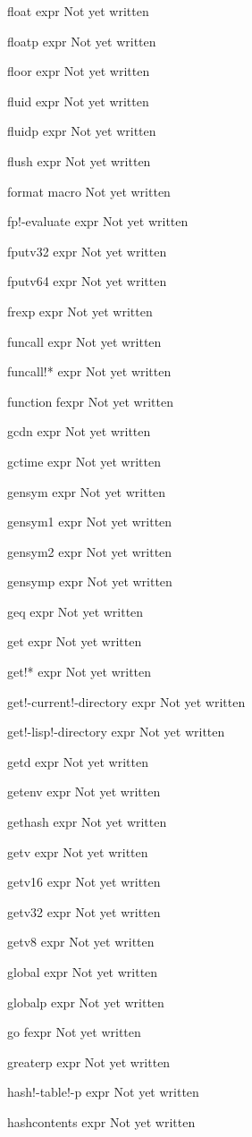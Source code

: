 \documentclass[a4paper,11pt]{article}
\begin{document}
\begin{description}
float expr
Not yet written

floatp expr
Not yet written

floor expr
Not yet written

fluid expr
Not yet written

fluidp expr
Not yet written

flush expr
Not yet written

format macro
Not yet written

fp!-evaluate expr
Not yet written

fputv32 expr
Not yet written

fputv64 expr
Not yet written

frexp expr
Not yet written

funcall expr
Not yet written

funcall!* expr
Not yet written

function fexpr
Not yet written

gcdn expr
Not yet written

gctime expr
Not yet written

gensym expr
Not yet written

gensym1 expr
Not yet written

gensym2 expr
Not yet written

gensymp expr
Not yet written

geq expr
Not yet written

get expr
Not yet written

get!* expr
Not yet written

get!-current!-directory expr
Not yet written

get!-lisp!-directory expr
Not yet written

getd expr
Not yet written

getenv expr
Not yet written

gethash expr
Not yet written

getv expr
Not yet written

getv16 expr
Not yet written

getv32 expr
Not yet written

getv8 expr
Not yet written

global expr
Not yet written

globalp expr
Not yet written

go fexpr
Not yet written

greaterp expr
Not yet written

hash!-table!-p expr
Not yet written

hashcontents expr
Not yet written


\end{description}
\end{document}
